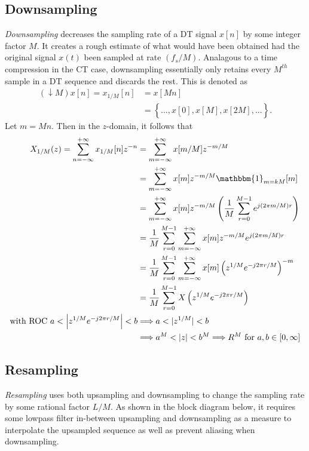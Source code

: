 \documentclass{report}
\begin{document}
\subsection{Downsampling}
\emph{Downsampling} decreases the sampling rate of a DT signal $x[n]$ by some integer factor $M$. It creates a rough estimate of 
what would have been obtained had the original signal $x(t)$ been sampled at rate $(f_s/M)$. Analagous to 
a time compression in the CT case, downsampling essentially only retains every $M^{th}$ sample in a DT sequence and discards the rest. 
This is denoted as 
\begin{align}
    (\downarrow M)x[n] = x_{1/M}[n] &= x[Mn] \\
    &= \left\{...,\underbar{x[0]}, x[M], x[2M], ...\right\}.
\end{align}
Let $m=Mn$. Then in the $z$-domain, it follows that
\begin{align}
    X_{1/M}(z) = \sum_{n=-\infty}^{+\infty} x_{1/M}[n]z^{-n} &= \sum_{m=-\infty}^{+\infty} x[m/M]z^{-m/M} \nonumber \\
    &= \sum_{m=-\infty}^{+\infty} x[m]z^{-m/M}\mathbbm{1}_{m=kM}[m] \nonumber \\
    &= \sum_{m=-\infty}^{+\infty} x[m]z^{-m/M}\left(\frac{1}{M}\sum_{r=0}^{M-1}e^{j(2\pi m/M)r}\right) \nonumber \\
    &= \frac{1}{M} \sum_{r=0}^{M-1}\sum_{m=-\infty}^{+\infty} x[m]z^{-m/M}e^{j(2\pi m/M)r} \nonumber \\
    &= \frac{1}{M} \sum_{r=0}^{M-1}\sum_{m=-\infty}^{+\infty} x[m]\left(z^{1/M}e^{-j2\pi r/M}\right)^{-m} \nonumber \\
    &= \frac{1}{M} \sum_{r=0}^{M-1} X\left(z^{1/M}e^{-j2\pi r/M}\right) \\
    \text{with ROC } a<\left|z^{1/M}e^{-j2\pi r/M}\right|<b &\Longrightarrow a<|z^{1/M}|<b \nonumber \\
    &\Longrightarrow a^M<|z|<b^M \Longrightarrow R^M \text{ for } a,b\in[0,\infty] \nonumber
\end{align}

\subsection{Resampling}
\emph{Resampling} uses both upsampling and downsampling to change the sampling rate by some rational factor $L/M$. As shown in the block diagram below, it 
requires some lowpass filter in-between upsampling and downsampling as a measure to interpolate the upsampled sequence as well as prevent aliasing when downsampling.
\end{document}
